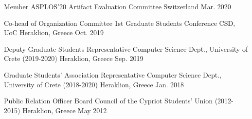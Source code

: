 \begin{cvhonors}
  \cvhonor
    {Member} %
    {ASPLOS'20 Artifact Evaluation Committee} %
    {Switzerland} %
    {Mar. 2020} %

  \cvhonor
    {Co-head of Organization Committee} %
    {1st Graduate Students Conference CSD, UoC} %
    {Heraklion, Greece} %
    {Oct. 2019} %

  \cvhonor
    {Deputy Graduate Students Representative} %
    {Computer Science Dept., University of Crete (2019-2020)} %
    {Heraklion, Greece} %
    {Sep. 2019} %

  \cvhonor
    {Graduate Students' Association Representative} %
    {Computer Science Dept., University of Crete (2018-2020)} %
    {Heraklion, Greece} %
    {Jan. 2018} %

  \cvhonor
    {Public Relation Officer} %
    {Board Council of the Cypriot Students' Union (2012-2015)} %
    {Heraklion, Greece} %
    {May 2012} %

\end{cvhonors}
